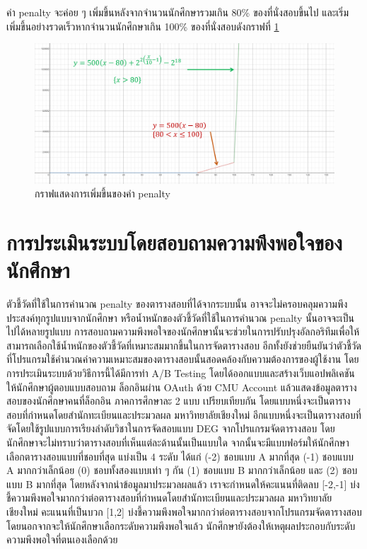 ค่า penalty จะค่อย ๆ เพิ่มขึ้นหลังจากจำนวนนักศึกษารวมเกิน 80\% ของที่นั่งสอบขึ้นไป และเริ่มเพิ่มขึ้นอย่างรวดเร็วหากจำนวนนักศึกษาเกิน 100\% ของที่นั่งสอบดังกราฟที่ \ref{fig:penalty_graph}
\begin{figure}
    \begin{center}
      \includegraphics[width=\linewidth]{images/penalty_graph.png}
    \end{center}
    \caption[กราฟแสดงการเพิ่มขึ้นของค่า penalty]{กราฟแสดงการเพิ่มขึ้นของค่า penalty}
    \label{fig:penalty_graph}     
\end{figure}
\newpage
\section{การประเมินระบบโดยสอบถามความพึงพอใจของนักศึกษา}
ตัวชี้วัดที่ใช้ในการคำนวณ penalty ของตารางสอบที่ได้จากระบบนั้น อาจจะไม่ครอบคลุมความพึงประสงค์ทุกรูปแบบจากนักศึกษา หรือน้ำหนักของตัวชี้วัดที่ใช้ในการคำนวณ penalty นั้นอาจจะเป็นไปได้หลายรูปแบบ
\enskip การสอบถามความพึงพอใจของนักศึกษานั้นจะช่วยในการปรับปรุงอัลกอริทึมเพื่อให้สามารถเลือกใช้น้ำหนักของตัวชี้วัดที่เหมาะสมมากขึ้นในการจัดตารางสอบ
อีกทั้งยังช่วยยืนยันว่าตัวชี้วัดที่โปรแกรมใช้คํานวณค่าความเหมาะสมของตารางสอบนั้นสอดคล้องกับความต้องการของผู้ใช้งาน 
\enskip โดยการประเมินระบบด้วยวิธีการนี้ได้มีการทำ A/B Testing โดยได้ออกแบบและสร้างเว็บแอปพลิเคชันให้นักศึกษาผู้ตอบแบบสอบถาม
ล็อกอินผ่าน OAuth ด้วย CMU Account แล้วแสดงข้อมูลตารางสอบของนักศึกษาคนที่ล็อกอิน ภาคการศึกษาละ 2 แบบ เปรียบเทียบกัน 
โดยแบบหนึ่งจะเป็นตารางสอบที่กำหนดโดยสำนักทะเบียนและประมวลผล มหาวิทยาลัยเชียงใหม่ 
อีกแบบหนึ่งจะเป็นตารางสอบที่จัดโดยใช้รูปแบบการเรียงลำดับวิชาในการจัดสอบแบบ DEG จากโปรแกรมจัดตารางสอบ
โดยนักศึกษาจะไม่ทราบว่าตารางสอบที่เห็นแต่ละด้านนั้นเป็นแบบใด จากนั้นจะมีแบบฟอร์มให้นักศึกษาเลือกตารางสอบแบบที่ชอบที่สุด แบ่งเป็น 4 ระดับ ได้แก่ (-2) ชอบแบบ A มากที่สุด (-1) ชอบแบบ A มากกว่าเล็กน้อย (0) ชอบทั้งสองแบบเท่า ๆ กัน (1) ชอบแบบ B มากกว่าเล็กน้อย และ (2) ชอบแบบ B มากที่สุด 
โดยหลังจากนำข้อมูลมาประมวลผลแล้ว เราจะกำหนดให้คะแนนที่ติดลบ [-2,-1] บ่งชี้ความพึงพอใจมากกว่าต่อตารางสอบที่กำหนดโดยสำนักทะเบียนและประมวลผล มหาวิทยาลัยเชียงใหม่
คะแนนที่เป็นบวก [1,2] บ่งชี้ความพึงพอใจมากกว่าต่อตารางสอบจากโปรแกรมจัดตารางสอบ โดยนอกจากจะให้นักศึกษาเลือกระดับความพึงพอใจแล้ว นักศึกษายังต้องให้เหตุผลประกอบกับระดับความพึงพอใจที่ตนเองเลือกด้วย

